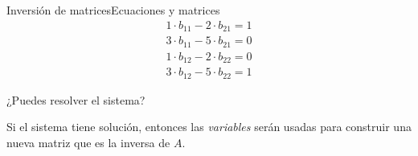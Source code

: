 \documentclass[spanish, c]{beamer}
\begin{document}
\begin{frame}{Inversión de matrices}{Ecuaciones y matrices}
        \begin{align}
            1 \cdot b_{11} - 2 \cdot b_{21} = 1 \\
            3 \cdot b_{11} - 5 \cdot b_{21} = 0 \\
            1 \cdot b_{12} - 2 \cdot b_{22} = 0 \\
            3 \cdot b_{12} - 5 \cdot b_{22} = 1
        \end{align} \pause

        ¿Puedes resolver el sistema? \pause \quad {}

        \bigskip

        Si el sistema tiene solución, entonces las \textit{variables} serán usadas para construir una nueva matriz que es la \alert{inversa} de $A$.
\end{frame}





\end{document}
